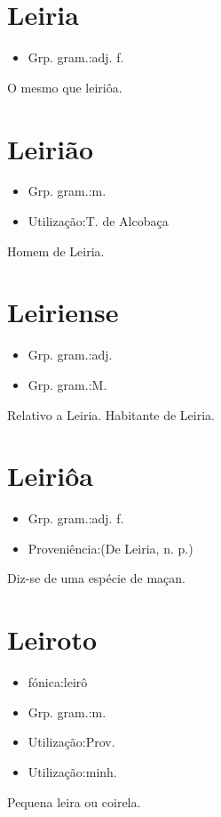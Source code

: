 \section{Leiria}
\begin{itemize}
\item {Grp. gram.:adj. f.}
\end{itemize}
O mesmo que \textunderscore leiriôa\textunderscore .
\section{Leirião}
\begin{itemize}
\item {Grp. gram.:m.}
\end{itemize}
\begin{itemize}
\item {Utilização:T. de Alcobaça}
\end{itemize}
Homem de Leiria.
\section{Leiriense}
\begin{itemize}
\item {Grp. gram.:adj.}
\end{itemize}
\begin{itemize}
\item {Grp. gram.:M.}
\end{itemize}
Relativo a Leiria.
Habitante de Leiria.
\section{Leiriôa}
\begin{itemize}
\item {Grp. gram.:adj. f.}
\end{itemize}
\begin{itemize}
\item {Proveniência:(De \textunderscore Leiria\textunderscore , n. p.)}
\end{itemize}
Diz-se de uma espécie de maçan.
\section{Leiroto}
\begin{itemize}
\item {fónica:leirô}
\end{itemize}
\begin{itemize}
\item {Grp. gram.:m.}
\end{itemize}
\begin{itemize}
\item {Utilização:Prov.}
\end{itemize}
\begin{itemize}
\item {Utilização:minh.}
\end{itemize}
Pequena leira ou coirela.
